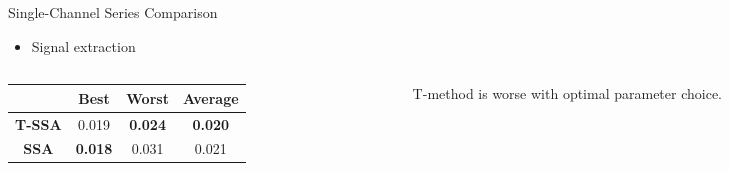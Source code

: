 \documentclass[pdf, unicode, ucs, notheorems]{beamer}
\newcommand{\bluetext}[1]{{\usebeamercolor[fg]{bluetext_color}#1}}
\theoremstyle{definition}
\begin{document}
\begin{frame}{Single-Channel Series Comparison}
  \begin{itemize}
    \item Signal extraction
  \end{itemize}
  \begin{columns}
    \begin{column}{0.65\textwidth}
      \begin{table}[ht]
        \centering
        \begin{tabular}{c|ccc}
          \hline
          & Best & Worst & Average \\
          \hline
          \textbf{T-SSA} & \bluetext{0.019} &
          \textbf{\bluetext{0.024}} &
          \textbf{\bluetext{0.020}} \\
          \textbf{SSA} & \textbf{\bluetext{0.018}} & 0.031 &
          \bluetext{0.021} \\
          \hline
        \end{tabular}
      \end{table}
    \end{column}
    \begin{column}{0.35\textwidth}
      T-method is worse with optimal parameter choice.
    \end{column}
  \end{columns}
\end{frame}
\end{document}
